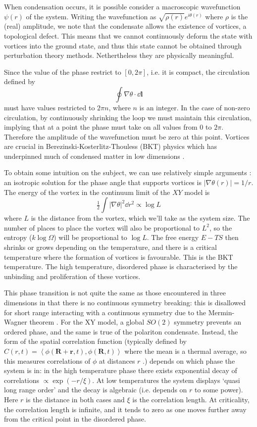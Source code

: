 \documentclass[letterpaper, 10 pt, conference]{IEEEtran}  %
\newcommand{\mean}[1]{\left < #1 \right >}
\newcommand{\myvec}[1]{\boldsymbol{#1}}
\begin{document}
When condensation occurs, it is possible consider a macroscopic wavefunction $\psi(r)$ of the system. 
Writing the wavefunction as $\sqrt{\rho(r)} e^{i \theta (r)}$ where $\rho$ is the (real) amplitude, we note that the condensate allows the existence of vortices, a topological defect.
This means that we cannot continuously deform the state with vortices into the ground state, and thus this state cannot be obtained through perturbation theory methods.
Nethertheless they are physically meaningful.  

Since the value of the phase restrict to $[0, 2 \pi]$, i.e. it is compact, the circulation defined by 
\[
\oint \nabla \theta \cdot \dd{\myvec{l}} 
\]
must have values restricted to $2\pi n$, where $n$ is an integer. 
In the case of non-zero circulation, by continuously shrinking the loop we must maintain this circulation, implying that at a point the phase must take on all values from 0 to $2\pi$. 
Therefore the amplitude of the wavefunction must be zero at this point.
Vortices are crucial in Berezinski-Kosterlitz-Thouless (BKT) physics which has underpinned much of condensed matter in low dimensions \cite{jose201340}. 

To obtain some intuition on the subject, we can use relatively simple arguments \cite{altland2010condensed}: an isotropic solution for the phase angle that supports vortices is $|\nabla \theta(r)| =1/r$. 
The energy of the vortex in the continuum limit of the $XY$ model is
\[
\tfrac12 \int |\nabla \theta |^2 \dd r^2 \propto \log L
\]
where $L$ is the distance from the vortex, which we'll take as the system size. 
The number of places to place the vortex will also be proportional to $L^2$, so the entropy ($k \log \Omega$) will be proportional to $\log L$. 
The free energy $E - TS$ then shrinks or grows depending on the temperature, and there is a critical temperature where the formation of vortices is favourable. 
This is the BKT temperature.
The high temperature, disordered phase is characterised by the unbinding and proliferation of these vortices.
 
This phase transition is not quite the same as those encountered in three dimensions in that there is no continuous symmetry breaking: this is disallowed for short range interacting with a continuous symmetry due to the Mermin-Wagner theorem \cite{Coleman1973}. 
For the XY model, a global $SO(2)$ symmetry prevents an ordered phase, and the same is true of the polariton condensate. 
Instead, the form of the spatial correlation function (typically defined by $C(r,t) = \mean{\phi(\myvec{R} + \myvec{r}, t),\phi(\myvec{R}, t)}$ where the mean is a thermal average, so this measures correlations of $\phi$ at distances $r$ \cite{binney1992the}.) depends on which phase the system is in: in the high temperature phase there exists exponential decay of correlations $\propto \exp (-r / \xi)$. 
At low temperatures the system displays `quasi long range order' and the decay is algebraic (i.e. depends on $r$ to some power).
Here $r$ is the distance in both cases and $\xi$ is the correlation length. 
At criticality, the correlation length is infinite, and it tends to zero as one moves further away from the critical point in the disordered phase. 
 
\end{document}
